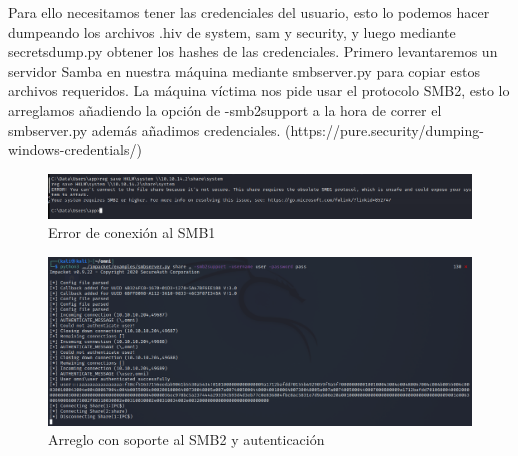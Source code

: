 \documentclass{article}
\begin{document}
Para ello necesitamos tener las credenciales del usuario, esto lo podemos hacer dumpeando los archivos .hiv de system, sam y security, y luego mediante secretsdump.py obtener los hashes de las credenciales.
Primero levantaremos un servidor Samba en nuestra máquina mediante smbserver.py para copiar estos archivos requeridos. La máquina víctima nos pide usar el protocolo SMB2, esto lo arreglamos añadiendo la opción de -smb2support a la hora de correr el smbserver.py además añadimos credenciales. (https://pure.security/dumping-windows-credentials/)
\begin{figure}[H]
	\center
	\includegraphics[width=\textwidth]{images/omni/10.png}
	\caption{Error de conexión al SMB1}
\end{figure}
\begin{figure}[H]
	\center
	\includegraphics[width=\textwidth]{images/omni/11.png}
	\caption{Arreglo con soporte al SMB2 y autenticación}
\end{figure}
\end{document}
